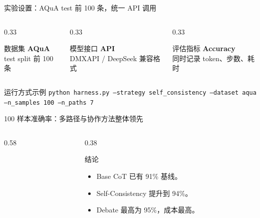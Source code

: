 \documentclass[10pt,aspectratio=169]{beamer}
\newcommand{\tightitems}{\setlength{\itemsep}{0.24em}}
\newcommand{\metric}[3]{%
  \begin{block}{#1}
    \centering
    {\LARGE\bfseries #2}\\[-0.1em]
    {\scriptsize\textcolor{Muted}{#3}}
  \end{block}
}
\begin{document}
\begin{frame}{实验设置：AQuA test 前 100 条，统一 API 调用}
  \begin{columns}[T,onlytextwidth]
    \begin{column}{0.33\textwidth}
      \metric{数据集}{AQuA}{test split 前 100 条}
    \end{column}
    \begin{column}{0.33\textwidth}
      \metric{模型接口}{API}{DMXAPI / DeepSeek 兼容格式}
    \end{column}
    \begin{column}{0.33\textwidth}
      \metric{评估指标}{Accuracy}{同时记录 token、步数、耗时}
    \end{column}
  \end{columns}

  \vspace{0.6em}
  \begin{block}{运行方式示例}
    \small
    \texttt{python harness.py --strategy self\_consistency --dataset aqua --n\_samples 100 --n\_paths 7}
  \end{block}
\end{frame}

\begin{frame}{100 样本准确率：多路径与协作方法整体领先}
  \begin{columns}[T,onlytextwidth]
    \begin{column}{0.58\textwidth}
    \end{column}
    \begin{column}{0.38\textwidth}
      \begin{block}{结论}
        \begin{itemize}
          \tightitems
          \item Base CoT 已有 91\% 基线。
          \item Self-Consistency 提升到 94\%。
          \item Debate 最高为 95\%，成本最高。
        \end{itemize}
      \end{block}
    \end{column}
  \end{columns}
\end{frame}
\end{document}

